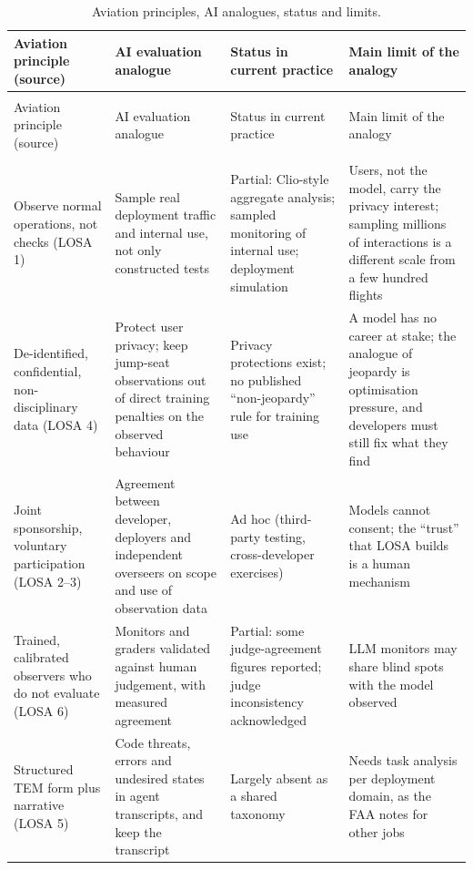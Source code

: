 \documentclass[11pt]{article}
\begin{document}
{\small
\setlength{\tabcolsep}{4pt}
\begin{longtable}{@{}>{\raggedright\arraybackslash}p{}>{\raggedright\arraybackslash}p{}>{\raggedright\arraybackslash}p{}>{\raggedright\arraybackslash}p{}@{}}
\caption{Aviation principles, AI analogues, status and limits.}\label{tab:mapping}\\
\toprule
Aviation principle (source) & AI evaluation analogue & Status in current practice & Main limit of the analogy \\
\midrule
\endfirsthead
\multicolumn{4}{@{}l}{\small\itshape Table~\ref{tab:mapping} (continued)}\\
\toprule
Aviation principle (source) & AI evaluation analogue & Status in current practice & Main limit of the analogy \\
\midrule
\endhead
\midrule
\multicolumn{4}{r@{}}{\small\itshape Continued on next page}\\
\endfoot
\bottomrule
\endlastfoot
Observe normal operations, not checks (LOSA 1) & Sample real deployment traffic and internal use, not only constructed tests & Partial: Clio-style aggregate analysis; sampled monitoring of internal use; deployment simulation & Users, not the model, carry the privacy interest; sampling millions of interactions is a different scale from a few hundred flights \\
De-identified, confidential, non-disciplinary data (LOSA 4) & Protect user privacy; keep jump-seat observations out of direct training penalties on the observed behaviour & Privacy protections exist; no published ``non-jeopardy'' rule for training use & A model has no career at stake; the analogue of jeopardy is optimisation pressure, and developers must still fix what they find \\
Joint sponsorship, voluntary participation (LOSA 2--3) & Agreement between developer, deployers and independent overseers on scope and use of observation data & Ad hoc (third-party testing, cross-developer exercises) & Models cannot consent; the ``trust'' that LOSA builds is a human mechanism \\
Trained, calibrated observers who do not evaluate (LOSA 6) & Monitors and graders validated against human judgement, with measured agreement & Partial: some judge-agreement figures reported; judge inconsistency acknowledged & LLM monitors may share blind spots with the model observed \\
Structured TEM form plus narrative (LOSA 5) & Code threats, errors and undesired states in agent transcripts, and keep the transcript & Largely absent as a shared taxonomy & Needs task analysis per deployment domain, as the FAA notes for other jobs \\

\end{longtable}}
\end{document}
